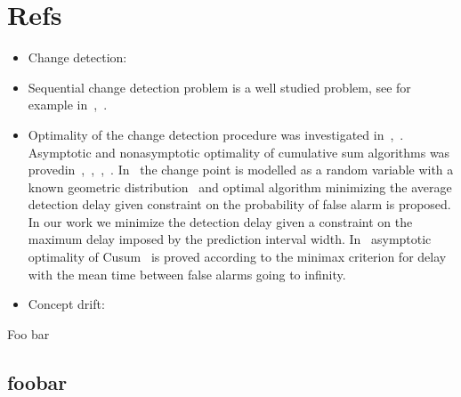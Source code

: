 \documentclass[doctoral,utf8,lot,loar,lof,shortloft,index]{jydiss}
\begin{document}


\chapter{Refs}
\begin{itemize}
  \item Change detection:~\cite{basseville1993detection}
  \item Sequential change detection problem is a well studied problem, see for example in~\cite{tartakovsky2014sequential},~\cite{plasse2021streaming}.

  \item Optimality of the change detection procedure was investigated in~\cite{Page1954},~\cite{Shiryaev2010,Shiryaev1961,Shiryaev1963}.
  Asymptotic and nonasymptotic optimality of cumulative sum algorithms was provedin~\cite{lorden1971procedures},~\cite{moustakides1986optimal},~\cite{moustakides2004optimality},~\cite{ritov1990decision}. In~\cite{Shiryaev1963,shiryaev2007optimal} the change point is modelled as a random variable with a known geometric distribution~\cite{veeravalli2014quickest} and optimal algorithm minimizing the average detection delay given constraint on the probability of false alarm is proposed. In our work we minimize the detection delay given a constraint on the maximum delay imposed by the prediction interval width. In~\cite{lorden1971procedures} asymptotic optimality of Cusum~\cite{Page1954} is proved according to the minimax criterion for delay with the mean time between false alarms going to infinity.

  \item Concept drift:
\end{itemize}

\tailmatter
\finnishsummary
Foo bar



\appendices
{}
\section{foobar}

\backmatter


\printindex
\end{document}
